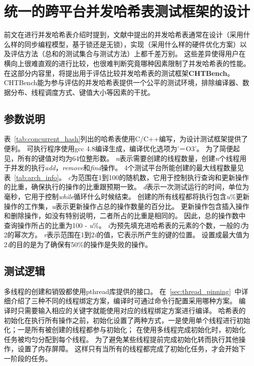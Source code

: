 \section{统一的跨平台并发哈希表测试框架的设计}
\label{sec:design_framework}

前文在进行并发哈希表介绍时提到，文献中提出的并发哈希表通常在设计（采用什么样的同步编程模型，基于锁还是无锁），实现（采用什么样的硬件优化方案）以及评估方法（总和的测试集合与测试方法）上都千差万别。
这些差异使得用户在横向上很难直观的进行比较，也很难判断究竟哪种因素限制了并发哈希表的性能。
在这部分内容里，将提出用于评估比较并发哈希表的测试框架\textbf{CHTBench}。
CHTBench能为参与评估的并发哈希表提供一个公平的测试环境，排除编译器、数据分布、线程调度方式、键值大小等因素的干扰。

\subsection{参数说明}
表~\ref{tab:concurrent_hash}列出的哈希表使用C/C++编写，为设计测试框架提供了便利。
可执行程序使用gcc 4.8编译生成，编译优化选项为'－O3'。
为了简便起见，所有的键值对均为64位整形数。
\textit{n}表示需要创建的线程数量，创建\textit{n}个线程用于并发的执行\textit{add}，\textit{remove}和\textit{find}操作。
4个测试平台所能创建的最大线程数量见表~\ref{tab:arch_info}。
\textit{c}为范围在1到100的随机数，它用于控制执行查询和更新操作的比重，确保执行的操作的比重跟预期一致。
\textit{d}表示一次测试运行的时间，单位为毫秒，它用于控制\textit{while}循环什么时候结束。
创建的所有线程都将执行包含\textit{u}\%更新操作的工作集，\textit{u}表示更新操作占总的操作数量的百分比。
更新操作包含插入操作和删除操作，如没有特别说明，二者所占的比重是相同的。
因此，总的操作数中查询操作所占的比重为100 - \textit{u}\%。
\textit{i}为预先填充进哈希表的元素的个数，一般的\textit{i}为2的幂次方。
\textit{r}表示范围在1到2\textit{i}的值，它表示所产生的键的位置。
设置成最大值为2\textit{i}的目的是为了确保有50\%的操作是失败的操作。

\subsection{测试逻辑}
\label{sec:para_config}
多线程的创建和销毁都使用pthread库提供的接口。
在~\ref{sec:thread_pinning}~中详细介绍了三种不同的线程绑定方案，编译时可通过命令行配置采用哪种方案。
编译时只需要输入相应的关键字就能使用对应的线程绑定方案进行编译。
哈希表的初始化在执行所有操作之前，初始化设置了两种方式，一是使用单个线程进行初始化；一是所有被创建的线程都参与初始化；
在使用多线程完成初始化时，初始化任务被均匀分配到每个线程。
为了避免某些线程提前完成初始化转而执行其他操作，设置了内存屏障。
这样只有当所有的线程都完成了初始化任务，才会开始下一阶段的任务。

